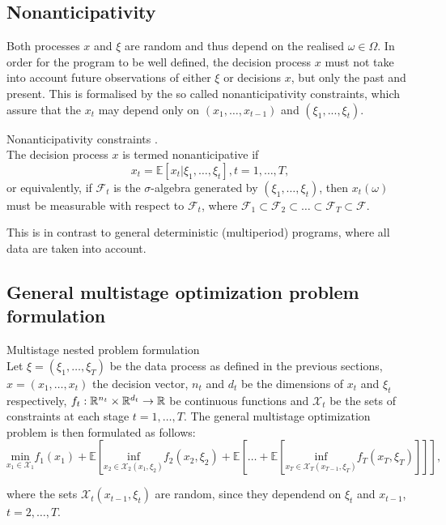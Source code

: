 \subsection{Nonanticipativity}
Both processes $x$ and $\xi$ are random and thus depend on the realised $\omega \in \Omega$. In order for the program to be well defined, the decision process $x$ must not take into account future observations of either
$\xi$ or decisions $x$, but only the past and present. This is formalised by the so called nonanticipativity constraints, which assure that the $x_t$ may depend only on $(x_1,\dots,x_{t-1})$ and $(\xi_1,...,\xi_{t})$.

\begin{defn}{Nonanticipativity constraints} \cite[Section 3.3.]{stochasticprogrammingbible}. \\
\label{def:nonanticipativity constraints}
The decision process $x$ is termed nonanticipative if
\begin{equation*}
x_t=\mathbb{E}\left[x_t|\xi_1,\dots,\xi_t \right], t=1,\dots,T,
\end{equation*}
or equivalently, if $\mathcal{F}_t$ is the $\sigma$-algebra generated by $(\xi_1,\dots,\xi_t)$, then $x_t(\omega)$ must be measurable with respect to $\mathcal{F}_t$, where $\mathcal{F}_1 \subset \mathcal{F}_2 \subset \dots \subset \mathcal{F}_T \subset \mathcal{F}$.
\end{defn}
This is in contrast to general deterministic (multiperiod) programs, where all data are taken into account.

\subsection{General multistage optimization problem formulation}
\begin{defn}{Multistage nested problem formulation \cite[Section 3.1.1.]{stochasticprogrammingbible2009}} \\
Let $\xi=(\xi_1,\dots,\xi_{T})$ be the data process as defined in the previous sections, \\ $x=(x_1,\dots,x_t)$ the decision vector, $n_t$ and $d_t$ be the dimensions of $x_t$ and $\xi_t$ respectively, $f_t: \mathbb{R}^{n_t} \times \mathbb{R}^{d_t} \rightarrow \mathbb{R}$ be continuous functions and $
\mathcal{X}_t$ be the sets of constraints at each stage $t=1,\dots,T$. The general multistage optimization problem is then formulated as follows:
\footnotesize
\begin{equation}
\label{eq:generalmultistageprogrammingformulation}
\underset{x_1 \in \mathcal{X}_1}{\mathrm{min}}
 f_1(x_1) + \mathbb{E}\left[ \underset{x_2 \in \mathcal{X}_2(x_1, \xi_2)}{\mathrm{inf}} f_2(x_2,\xi_2) + \mathbb{E}\left[\dots + \mathbb{E}\left[ \underset{x_T \in \mathcal{X}_T(x_{T-1}, \xi_T)}{\mathrm{inf}} f_T(x_T,\xi_T)\right] \right] \right],
\end{equation}

\normalsize
where the sets $\mathcal{X}_t(x_{t-1},\xi_t)$ are random, since they dependend on $\xi_t$ and $x_{t-1}$, $t=2,\dots,T$.
\end{defn}



